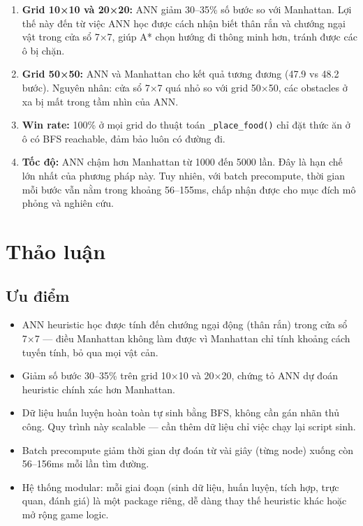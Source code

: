 \documentclass[12pt,a4paper]{article}
\begin{document}
\begin{enumerate}
    \item \textbf{Grid 10×10 và 20×20:} ANN giảm 30--35\% số bước so với Manhattan. Lợi thế này đến từ việc ANN học được cách nhận biết thân rắn và chướng ngại vật trong cửa sổ 7×7, giúp A* chọn hướng đi thông minh hơn, tránh được các ô bị chặn.
    
    \item \textbf{Grid 50×50:} ANN và Manhattan cho kết quả tương đương (47.9 vs 48.2 bước). Nguyên nhân: cửa sổ 7×7 quá nhỏ so với grid 50×50, các obstacles ở xa bị mất trong tầm nhìn của ANN.
    
    \item \textbf{Win rate:} 100\% ở mọi grid do thuật toán \lstinline{_place_food()} chỉ đặt thức ăn ở ô có BFS reachable, đảm bảo luôn có đường đi.
    
    \item \textbf{Tốc độ:} ANN chậm hơn Manhattan từ 1000 đến 5000 lần. Đây là hạn chế lớn nhất của phương pháp này. Tuy nhiên, với batch precompute, thời gian mỗi bước vẫn nằm trong khoảng 56--155ms, chấp nhận được cho mục đích mô phỏng và nghiên cứu.
\end{enumerate}

\newpage

\section{Thảo luận}

\subsection{Ưu điểm}

\begin{itemize}
    \item ANN heuristic học được tính đến chướng ngại động (thân rắn) trong cửa sổ 7×7 --- điều Manhattan không làm được vì Manhattan chỉ tính khoảng cách tuyến tính, bỏ qua mọi vật cản.
    
    \item Giảm số bước 30--35\% trên grid 10×10 và 20×20, chứng tỏ ANN dự đoán heuristic chính xác hơn Manhattan.
    
    \item Dữ liệu huấn luyện hoàn toàn tự sinh bằng BFS, không cần gán nhãn thủ công. Quy trình này scalable --- cần thêm dữ liệu chỉ việc chạy lại script sinh.
    
    \item Batch precompute giảm thời gian dự đoán từ vài giây (từng node) xuống còn 56--156ms mỗi lần tìm đường.
    
    \item Hệ thống modular: mỗi giai đoạn (sinh dữ liệu, huấn luyện, tích hợp, trực quan, đánh giá) là một package riêng, dễ dàng thay thế heuristic khác hoặc mở rộng game logic.
\end{itemize}
\end{document}
